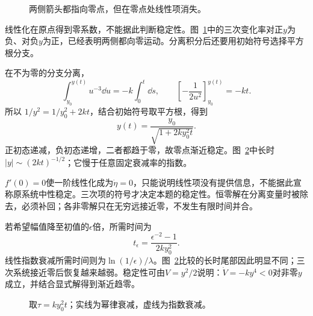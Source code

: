 \begin{figure}[H]\centering
{}
\caption{两侧箭头都指向零点，但在零点处线性项消失。}\label{fig:c2-h15-q}
\end{figure}
\begin{solution}
线性化在原点得到零系数，不能据此判断稳定性。图~\ref{fig:c2-h15-q}中的三次变化率对正$y$为负、对负$y$为正，已经表明两侧都向零运动。分离积分后还要用初始符号选择平方根分支。


在不为零的分支分离，
\[
\int_{y_0}^{y(t)}u^{-3}\dd u=-k\int_0^t\dd s,\qquad
\left[-\frac1{2u^2}\right]_{y_0}^{y(t)}=-kt.
\]
所以 $1/y^2=1/y_0^2+2kt$，结合初始符号取平方根，得到
\[\boxed{y(t)=\frac{y_0}{\sqrt{1+2ky_0^2t}}}.
\]
正初态递减，负初态递增，二者都趋于零，故零点渐近稳定。图~\ref{fig:c2-h15-s}中长时$|y|\sim(2kt)^{-1/2}$；它慢于任意固定衰减率的指数。

$f'(0)=0$使一阶线性化成为$\dot\eta=0$，只能说明线性项没有提供信息，不能据此宣称原系统中性稳定。三次项的符号才决定本题的稳定性。恒零解在分离变量时被除去，必须补回；各非零解只在无穷远接近零，不发生有限时间并合。


若希望幅值降至初值的$\epsilon$倍，所需时间为
\[t_\epsilon=\frac{\epsilon^{-2}-1}{2ky_0^2}.\]
线性指数衰减所需时间则为$\ln(1/\epsilon)/\lambda$。图~\ref{fig:c2-h15-s}比较的长时尾部因此明显不同；三次系统接近零后恢复越来越弱。稳定性可由$V=y^2/2$说明：$\dot V=-ky^4<0$对非零$y$成立，并结合显式解得到渐近趋零。

\begin{figure}[H]\centering
{}
\caption{取$\tau=ky_0^2t$；实线为幂律衰减，虚线为指数衰减。}\label{fig:c2-h15-s}
\end{figure}
\end{solution}

